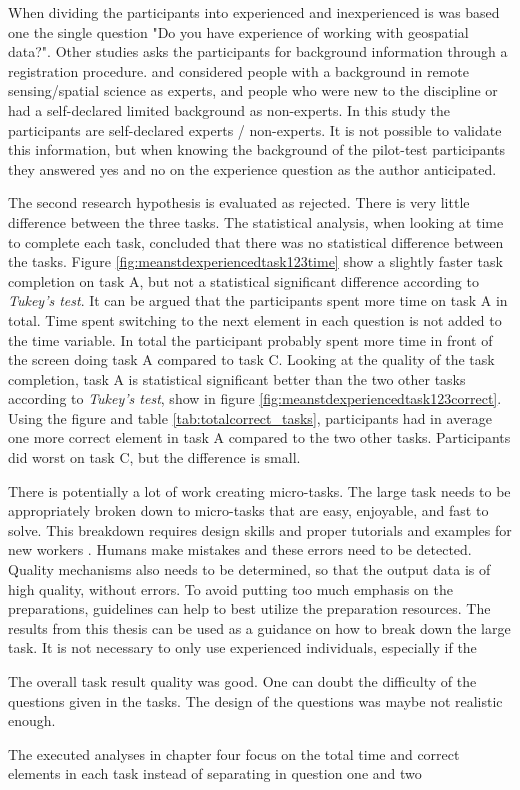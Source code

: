 When dividing the participants into experienced and inexperienced is was based one the single question "Do you have experience of working with geospatial data?". Other studies asks the participants for background information through a registration procedure. \cite{See2013} and \cite{Salk2016} considered people with a background in remote sensing/spatial science as experts, and people who were new to the discipline or had a self-declared limited background as non-experts. In this study the participants are self-declared experts / non-experts. It is not possible to validate this information, but when knowing the background of the pilot-test participants they answered yes and no on the experience question as the author anticipated. 

The second research hypothesis is evaluated as rejected. There is very little difference between the three tasks. The statistical analysis, when looking at time to complete each task, concluded that there was no statistical difference between the tasks. Figure \ref{fig:meanstdexperiencedtask123time} show a slightly faster task completion on task A, but not a statistical significant difference according to \textit{Tukey's test}. It can be argued that the participants spent more time on task A in total. Time spent switching to the next element in each question is not added to the time variable. In total the participant probably spent more time in front of the screen doing task A compared to task C. Looking at the quality of the task completion, task A is statistical significant better than the two other tasks according to \textit{Tukey's test}, show in figure \ref{fig:meanstdexperiencedtask123correct}. Using the figure and table \ref{tab:totalcorrect_tasks}, participants had in average one more correct element in task A compared to the two other tasks. Participants did worst on task C, but the difference is small. 

There is potentially a lot of work creating micro-tasks. The large task needs to be appropriately broken down to micro-tasks that are easy, enjoyable, and fast to solve. This breakdown requires design skills and proper tutorials and examples for new workers \citep{Schulze2012}. Humans make mistakes and these errors need to be detected. Quality mechanisms also needs to be determined, so that the output data is of high quality, without errors. To avoid putting too much emphasis on the preparations, guidelines can help to best utilize the preparation resources. The results from this thesis can be used as a guidance on how to break down the large task. It is not necessary to only use experienced individuals, especially if the 

The overall task result quality was good. One can doubt the difficulty of the questions given in the tasks. The design of the questions was maybe not realistic enough. 

The executed analyses in chapter four focus on the total time and correct elements in each task instead of separating in question one and two 